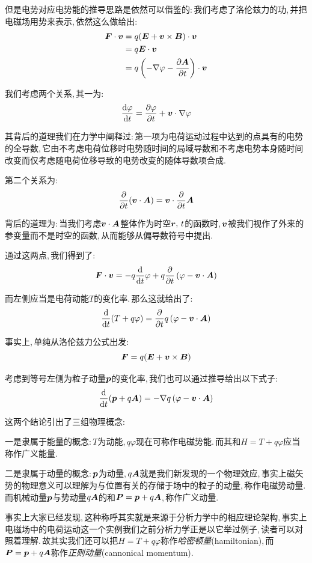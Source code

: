 但是电势对应电势能的推导思路是依然可以借鉴的:\,我们考虑了洛伦兹力的功,\,并把电磁场用势来表示,\,依然这么做给出:
\begin{align*}
\boldsymbol{F}\cdot \boldsymbol{v} &=q(\boldsymbol{E}+\boldsymbol{v}\times \boldsymbol{B})\cdot \boldsymbol{v}\\
&=q\boldsymbol{E}\cdot \boldsymbol{v}\\
&=q \left(-\nabla \varphi-\frac{\partial \boldsymbol{A}}{\partial t}\right)\cdot \boldsymbol{v}
\end{align*}

我们考虑两个关系,\,其一为:
\[\frac{\textrm{d} \varphi}{\textrm{d} t}=\frac{\partial \varphi}{\partial t}+\boldsymbol{v}\cdot \nabla\varphi\]

其背后的道理我们在力学中阐释过:\,第一项为电荷运动过程中达到的点具有的电势的全导数,\,它由不考虑电荷位移时电势随时间的局域导数和不考虑电势本身随时间改变而仅考虑随电荷位移导致的电势改变的随体导数项合成.

第二个关系为:
\[\frac{\partial}{\partial t}(\boldsymbol{v}\cdot \boldsymbol{A})=\boldsymbol{v}\cdot \frac{\partial}{\partial t}\boldsymbol{A}\]

背后的道理为:\,当我们考虑$\boldsymbol{v}\cdot \boldsymbol{A}$整体作为时空$\boldsymbol{r},\,t$的函数时,\,$\boldsymbol{v}$被我们视作了外来的参变量而不是时空的函数,\,从而能够从偏导数符号中提出.

通过这两点,\,我们得到了:
\[\boldsymbol{F}\cdot \boldsymbol{v} =-q\frac{\textrm{d}}{\textrm{d} t}\varphi+q\frac{\partial}{\partial t}\left(\varphi-\boldsymbol{v}\cdot\boldsymbol{A}\right)\]

而左侧应当是电荷动能$T$的变化率.\,那么这就给出了:
\[\frac{\textrm{d}}{\textrm{d} t}(T+q\varphi)=\frac{\partial}{\partial t}q\left(\varphi-\boldsymbol{v}\cdot\boldsymbol{A}\right)\]

事实上,\,单纯从洛伦兹力公式出发:
\[\boldsymbol{F}=q(\boldsymbol{E}+\boldsymbol{v}\times \boldsymbol{B})\]

考虑到等号左侧为粒子动量$\boldsymbol{p}$的变化率,\,我们也可以通过推导给出以下式子:
\[\frac{\textrm{d}}{\textrm{d} t}(\boldsymbol{p}+q\boldsymbol{A})=-\nabla q\left(\varphi-\boldsymbol{v}\cdot\boldsymbol{A}\right)\]

这两个结论引出了三组物理概念:

一是隶属于能量的概念:\,$T$为动能,\,$q\varphi$现在可称作电磁势能.\,而其和$H=T+q\varphi$应当称作广义能量.

二是隶属于动量的概念:\,$\boldsymbol{p}$为动量,\,$q\boldsymbol{A}$就是我们新发现的一个物理效应,\,事实上磁矢势的物理意义可以理解为与位置有关的存储于场中的粒子的动量,\,称作电磁势动量.\,而机械动量$\boldsymbol{p}$与势动量$q\boldsymbol{A}$的和$\boldsymbol{P}=\boldsymbol{p}+q\boldsymbol{A}$,\,称作广义动量.

事实上大家已经发现,\,这种称呼其实就是来源于分析力学中的相应理论架构,\,事实上电磁场中的电荷运动这一个实例我们之前分析力学正是以它举过例子,\,读者可以对照着理解.\,故其实我们还可以把$H=T+q\varphi$称作\emph{哈密顿量}(hamiltonian),\,而$\boldsymbol{P}=\boldsymbol{p}+q\boldsymbol{A}$称作\emph{正则动量}(cannonical momentum).

